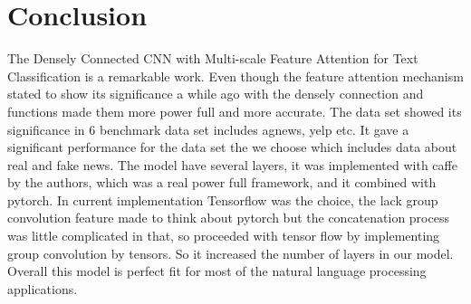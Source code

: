 \documentclass{MX2020}
\begin{document}
\vspace*{10pt}

\section{Conclusion}

The Densely Connected CNN with Multi-scale Feature Attention for Text Classification is a remarkable work. Even though the feature attention mechanism stated to show its significance a while ago with the densely connection and functions made them more power full and more accurate. The data set showed its significance in 6 benchmark data set includes agnews, yelp etc. It gave a significant performance for the data set the we choose which includes data about real and fake news. The model have several layers, it was implemented with caffe by the authors, which was a real power full framework, and it combined with pytorch. In current implementation Tensorflow was the choice, the lack group convolution feature made to think about pytorch but the concatenation process was little complicated in that, so proceeded with tensor flow by implementing group convolution by tensors.
So it increased the number of layers in our model. Overall this model is perfect fit for most of the natural language processing applications.
\vspace*{20pt}

	
	
\end{document}

